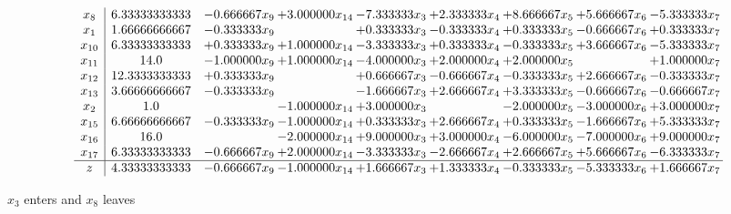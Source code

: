 \documentclass[10pt]{article}
\begin{document}
 \[\begin{array}{c| c c@{\hskip 2pt} c@{\hskip 2pt} c@{\hskip 2pt} c@{\hskip 2pt} c@{\hskip 2pt} c@{\hskip 2pt} c@{\hskip 2pt} }
 x_{8}   &  6.33333333333 & -0.666667 x_{9} & + 3.000000 x_{14} & -7.333333 x_{3} & + 2.333333 x_{4} & + 8.666667 x_{5} & + 5.666667 x_{6} & -5.333333 x_{7}\\
 x_{1}   &  1.66666666667 & -0.333333 x_{9} &   & + 0.333333 x_{3} & -0.333333 x_{4} & + 0.333333 x_{5} & -0.666667 x_{6} & + 0.333333 x_{7}\\
 x_{10}   &  6.33333333333 & + 0.333333 x_{9} & + 1.000000 x_{14} & -3.333333 x_{3} & + 0.333333 x_{4} & -0.333333 x_{5} & + 3.666667 x_{6} & -5.333333 x_{7}\\
 x_{11}   &  14.0 & -1.000000 x_{9} & + 1.000000 x_{14} & -4.000000 x_{3} & + 2.000000 x_{4} & + 2.000000 x_{5} &   & + 1.000000 x_{7}\\
 x_{12}   &  12.3333333333 & + 0.333333 x_{9} &   & + 0.666667 x_{3} & -0.666667 x_{4} & -0.333333 x_{5} & + 2.666667 x_{6} & -0.333333 x_{7}\\
 x_{13}   &  3.66666666667 & -0.333333 x_{9} &   & -1.666667 x_{3} & + 2.666667 x_{4} & + 3.333333 x_{5} & -0.666667 x_{6} & -0.666667 x_{7}\\
 x_{2}   &  1.0  &   & -1.000000 x_{14} & + 3.000000 x_{3} &   & -2.000000 x_{5} & -3.000000 x_{6} & + 3.000000 x_{7}\\
 x_{15}   &  6.66666666667 & -0.333333 x_{9} & -1.000000 x_{14} & + 0.333333 x_{3} & + 2.666667 x_{4} & + 0.333333 x_{5} & -1.666667 x_{6} & + 5.333333 x_{7}\\
 x_{16}   &  16.0  &   & -2.000000 x_{14} & + 9.000000 x_{3} & + 3.000000 x_{4} & -6.000000 x_{5} & -7.000000 x_{6} & + 9.000000 x_{7}\\
 x_{17}   &  6.33333333333 & -0.666667 x_{9} & + 2.000000 x_{14} & -3.333333 x_{3} & -2.666667 x_{4} & + 2.666667 x_{5} & + 5.666667 x_{6} & -6.333333 x_{7}\\
\hline
z    &  4.33333333333 & -0.666667 x_{9} & -1.000000 x_{14} & + 1.666667 x_{3} & + 1.333333 x_{4} & -0.333333 x_{5} & -5.333333 x_{6} & + 1.666667 x_{7}\\
\end{array}\]


 $ x_{3} $ enters and $ x_{8} $ leaves 
\end{document}
